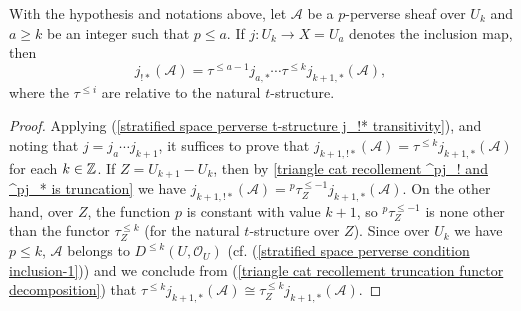 \begin{proposition}\label{stratified space perverse t-structure j_!* open union truncation char}
With the hypothesis and notations above, let $\mathscr{A}$ be a $p$-perverse sheaf over $U_k$ and $a\geq k$ be an integer such that $p\leq a$. If $j:U_k\to X=U_a$ denotes the inclusion map, then
\[j_{!*}(\mathscr{A})=\tau^{\leq a-1}j_{a,*}\cdots\tau^{\leq k}j_{k+1,*}(\mathscr{A}),\]
where the $\tau^{\leq i}$ are relative to the natural $t$-structure.
\end{proposition}
\begin{proof}
Applying (\ref{stratified space perverse t-structure j_!* transitivity}), and noting that $j=j_a\cdots j_{k+1}$, it suffices to prove that $j_{k+1,!*}(\mathscr{A})=\tau^{\leq k}j_{k+1,*}(\mathscr{A})$ for each $k\in\mathbb{Z}$. If $Z=U_{k+1}-U_k$, then by \cref{triangle cat recollement ^pj_! and ^pj_* is truncation} we have $j_{k+1,!*}(\mathscr{A})={^p\!\tau^{\leq -1}_Z}j_{k+1,*}(\mathscr{A})$. On the other hand, over $Z$, the function $p$ is constant with value $k+1$, so ${^p\!\tau^{\leq-1}_Z}$ is none other than the functor $\tau^{\leq k}_Z$ (for the natural $t$-structure over $Z$). Since over $U_k$ we have $p\leq k$, $\mathscr{A}$ belongs to $D^{\leq k}(U,\mathscr{O}_U)$ (cf. (\ref{stratified space perverse condition inclusion-1})) and we conclude from (\ref{triangle cat recollement truncation functor decomposition}) that $\tau^{\leq k}j_{k+1,*}(\mathscr{A})\cong\tau^{\leq k}_Zj_{k+1,*}(\mathscr{A})$.
\end{proof}

